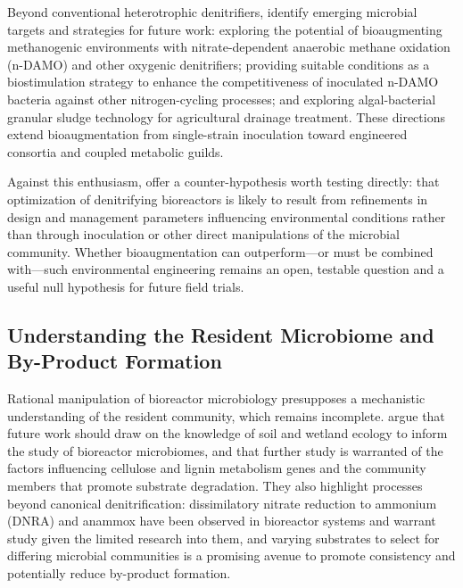 \documentclass[11pt]{article}
\begin{document}
Beyond conventional heterotrophic denitrifiers, \textcite{Wang2025b} identify emerging microbial targets and strategies for future work: exploring the potential of bioaugmenting methanogenic environments with nitrate-dependent anaerobic methane oxidation (n-DAMO) and other oxygenic denitrifiers; providing suitable conditions as a biostimulation strategy to enhance the competitiveness of inoculated n-DAMO bacteria against other nitrogen-cycling processes; and exploring algal-bacterial granular sludge technology for agricultural drainage treatment. These directions extend bioaugmentation from single-strain inoculation toward engineered consortia and coupled metabolic guilds.

Against this enthusiasm, \textcite{Hathaway2015} offer a counter-hypothesis worth testing directly: that optimization of denitrifying bioreactors is likely to result from refinements in design and management parameters influencing environmental conditions rather than through inoculation or other direct manipulations of the microbial community. Whether bioaugmentation can outperform---or must be combined with---such environmental engineering remains an open, testable question and a useful null hypothesis for future field trials.

\subsection{Understanding the Resident Microbiome and By-Product Formation}
Rational manipulation of bioreactor microbiology presupposes a mechanistic understanding of the resident community, which remains incomplete. \textcite{Hartfiel2022} argue that future work should draw on the knowledge of soil and wetland ecology to inform the study of bioreactor microbiomes, and that further study is warranted of the factors influencing cellulose and lignin metabolism genes and the community members that promote substrate degradation. They also highlight processes beyond canonical denitrification: dissimilatory nitrate reduction to ammonium (DNRA) and anammox have been observed in bioreactor systems and warrant study given the limited research into them, and varying substrates to select for differing microbial communities is a promising avenue to promote consistency and potentially reduce by-product formation.
\end{document}
